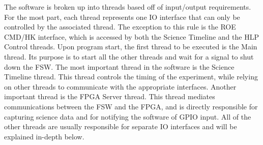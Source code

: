 The software is broken up into threads based off of input/output requirements. For the most part, each thread represents one IO interface that can only be controlled by the associated thread. The exception to this rule is the ROE CMD/HK interface, which is accessed by both the Science Timeline and the HLP Control threads. Upon program start, the first thread to be executed is the Main thread. Its purpose is to start all the other threads and wait for a signal to shut down the FSW. The most important thread in the software is the Science Timeline thread. This thread controls the timing of the experiment, while relying on other threads to communicate with the appropriate interfaces. Another important thread is the FPGA Server thread. This thread mediates communications between the FSW and the FPGA, and is directly responsible for capturing science data and for notifying the software of GPIO input. All of the other threads are usually responsible for separate IO interfaces and will be explained in-depth below.

